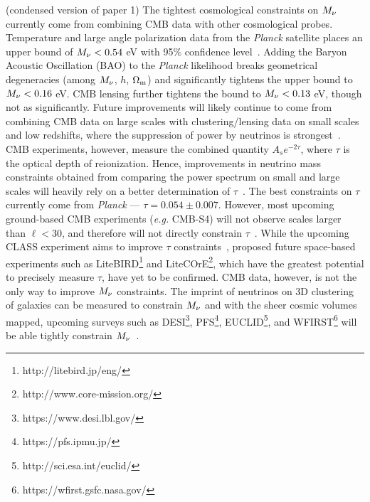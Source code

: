  (condensed version of paper 1) 
The tightest cosmological constraints on $M_\nu$ currently come from 
combining CMB data with other cosmological probes. Temperature and large 
angle polarization data from the {\em Planck} satellite places an upper 
bound of $M_\nu < 0.54$ eV with 95\% confidence level~\citep{planckcollaboration2018}. 
Adding the Baryon Acoustic Oscillation (BAO) to the {\em Planck} 
likelihood breaks geometrical degeneracies (among $M_\nu$, $h$, $\Omega_{\rm m}$) 
and significantly tightens the upper bound to $M_\nu < 0.16$ eV. CMB 
lensing further tightens the bound to $M_\nu < 0.13$ eV, though 
not as significantly. Future improvements will likely continue to come from combining CMB data 
on large scales with clustering/lensing data on small scales and low 
redshifts, where the suppression of power by neutrinos is strongest~\citep{brinckmann2019}. 
CMB experiments, however, measure the combined quantity $A_s e^{-2\tau}$, 
where $\tau$ is the optical depth of reionization. Hence, improvements in 
neutrino mass constraints obtained from comparing the power spectrum 
on small and large scales will heavily rely on a better determination of
$\tau$~\citep{allison2015, liu2016, archidiacono2017}. The best constraints on $\tau$ 
currently come from {\em Planck} --- $\tau = 0.054\pm0.007$. However, most
upcoming ground-based CMB experiments ({\em e.g.} CMB-S4) will not observe 
scales larger than $\ell < 30$, and therefore will not directly constrain 
$\tau$~\citep{abazajian2016}. While the upcoming CLASS experiment aims to 
improve $\tau$ constraints~\citep{watts2018}, proposed future space-based 
experiments such as LiteBIRD\footnote{http://litebird.jp/eng/} and 
LiteCOrE\footnote{http://www.core-mission.org/}, which have the greatest 
potential to precisely measure $\tau$, have yet to be confirmed. 
CMB data, however, is not the only way to improve $M_\nu$ constraints. The 
imprint of neutrinos on 3D clustering of galaxies can be measured to constrain 
$M_\nu$ and with the sheer cosmic volumes mapped, upcoming surveys such 
as DESI\footnote{https://www.desi.lbl.gov/}, PFS\footnote{https://pfs.ipmu.jp/}, 
EUCLID\footnote{http://sci.esa.int/euclid/}, and WFIRST\footnote{https://wfirst.gsfc.nasa.gov/} 
will be able tightly constrain 
$M_\nu$~\citep{audren2013, font-ribera2014, petracca2016, sartoris2016, boyle2018}.

